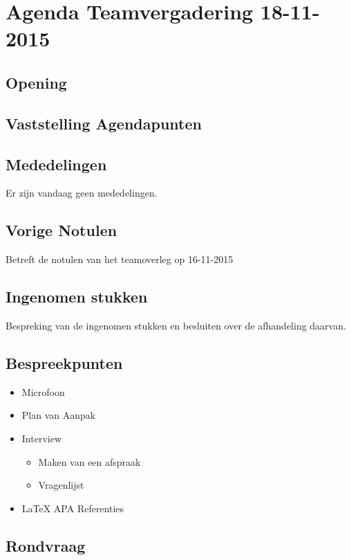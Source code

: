 \documentclass[dutch]{hu}
\subtitle{Agenda Teamvergadering \vergaderingDatum}
\def \vergaderingDatum{18-11-2015}
\begin{document}
\maketitle
\chapter{Agenda Teamvergadering \vergaderingDatum}
\section{Opening}

\section{Vaststelling Agendapunten}

\section{Mededelingen}
Er zijn vandaag geen mededelingen.

\section{Vorige Notulen}
Betreft de notulen van het teamoverleg op 16-11-2015

\section{Ingenomen stukken}
Bespreking van de ingenomen stukken en besluiten over de afhandeling daarvan.

\section{Bespreekpunten}
\begin{itemize}
\item Microfoon
\item Plan van Aanpak
\item Interview
	\begin{itemize}
	\item Maken van een afspraak
	\item Vragenlijst
	\end{itemize}
\item LaTeX APA Referenties
\end{itemize}

\section{Rondvraag}
\end{document}

